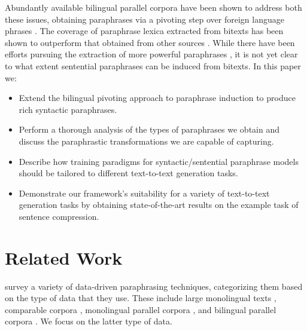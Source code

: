 \documentclass[11pt]{article}
\begin{document}
Abundantly available bilingual parallel corpora have been shown to
address both these issues, obtaining paraphrases via a pivoting step
over foreign language phrases \cite{Callison-Burch2005}. The coverage
of paraphrase lexica extracted from bitexts has been shown to
outperform that obtained from other sources \cite{Zhao2008b}. While
there have been efforts pursuing the extraction of more powerful
paraphrases
\cite{Madnani2007,Callison-Burch2008,cohn-lapata:2008,Zhao2008}, it is
not yet clear to what extent sentential paraphrases can be induced
from bitexts. In this paper we:
\begin{itemize}
\item Extend the bilingual pivoting approach to paraphrase induction
  to produce rich syntactic paraphrases.
\item Perform a thorough analysis of the types of paraphrases we
  obtain and discuss the paraphrastic transformations we are capable
  of capturing.
\item Describe how training paradigms for
  syntactic/sentential paraphrase models should be tailored to
  different text-to-text generation tasks.
\item Demonstrate our framework's suitability for a variety of
  text-to-text generation tasks by obtaining state-of-the-art results on the example task of sentence
  compression.
\end{itemize}


\section{Related Work} \label{related_work}

 survey a variety of data-driven paraphrasing
techniques, categorizing them based on the type of data that they use.
These include large monolingual texts
\cite{Lin2001,szpektor-EtAl:2004:EMNLP,Bhagat2008}, comparable corpora
\cite{Barzilay2003,Dolan2004}, monolingual parallel corpora
\cite{Barzilay2001,Pang2003}, and bilingual parallel corpora
\cite{Callison-Burch2005,Madnani2007,Zhao2008}.  We focus on the
latter type of data.
\end{document}
